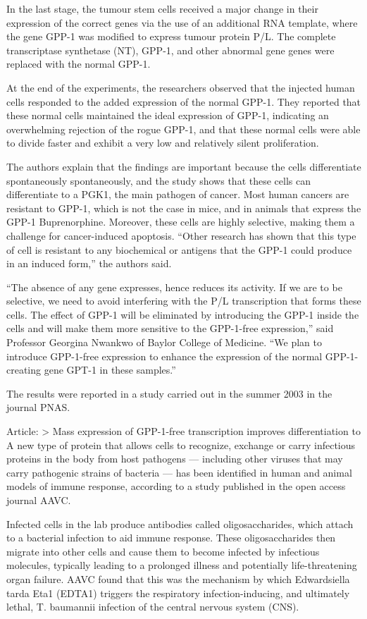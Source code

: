 \documentclass{article}
\begin{document}
In the last stage, the tumour stem cells received a major change in their expression of the correct genes via the use of an additional RNA template, where the gene GPP-1 was modified to express tumour protein P/L. The complete transcriptase synthetase (NT), GPP-1, and other abnormal gene genes were replaced with the normal GPP-1.

At the end of the experiments, the researchers observed that the injected human cells responded to the added expression of the normal GPP-1. They reported that these normal cells maintained the ideal expression of GPP-1, indicating an overwhelming rejection of the rogue GPP-1, and that these normal cells were able to divide faster and exhibit a very low and relatively silent proliferation.

The authors explain that the findings are important because the cells differentiate spontaneously spontaneously, and the study shows that these cells can differentiate to a PGK1, the main pathogen of cancer. Most human cancers are resistant to GPP-1, which is not the case in mice, and in animals that express the GPP-1 Buprenorphine. Moreover, these cells are highly selective, making them a challenge for cancer-induced apoptosis. “Other research has shown that this type of cell is resistant to any biochemical or antigens that the GPP-1 could produce in an induced form,” the authors said.

“The absence of any gene expresses, hence reduces its activity. If we are to be selective, we need to avoid interfering with the P/L transcription that forms these cells. The effect of GPP-1 will be eliminated by introducing the GPP-1 inside the cells and will make them more sensitive to the GPP-1-free expression,” said Professor Georgina Nwankwo of Baylor College of Medicine. “We plan to introduce GPP-1-free expression to enhance the expression of the normal GPP-1-creating gene GPT-1 in these samples.”

The results were reported in a study carried out in the summer 2003 in the journal PNAS.

Article: > Mass expression of GPP-1-free transcription improves differentiation to A new type of protein that allows cells to recognize, exchange or carry infectious proteins in the body from host pathogens — including other viruses that may carry pathogenic strains of bacteria — has been identified in human and animal models of immune response, according to a study published in the open access journal AAVC.

Infected cells in the lab produce antibodies called oligosaccharides, which attach to a bacterial infection to aid immune response. These oligosaccharides then migrate into other cells and cause them to become infected by infectious molecules, typically leading to a prolonged illness and potentially life-threatening organ failure. AAVC found that this was the mechanism by which Edwardsiella tarda Eta1 (EDTA1) triggers the respiratory infection-inducing, and ultimately lethal, T. baumannii infection of the central nervous system (CNS).
\end{document}
